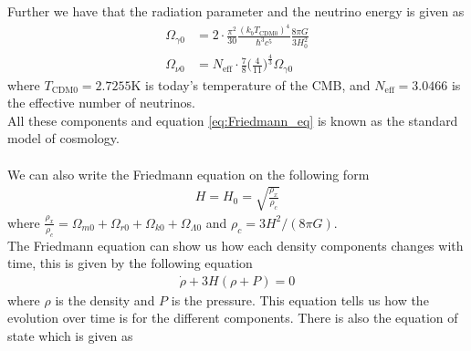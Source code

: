 \documentclass{article}
\begin{document}
\begin{multicols}{2}
Further we have that the radiation parameter and the neutrino energy is given as 
\begin{align}
    \Omega_{\gamma0}&= 2\cdot \frac{\pi^2}{30}\frac{(k_bT_{\text{CDM}0})^4}{\hbar^3c^5}\frac{8\pi G}{3H_0^2}\\
    \Omega_{\nu0}&=N_\text{eff}\cdot\frac{7}{8}\bigg(\frac{4}{11}\bigg)^\frac{4}{3}\Omega_{\gamma0}
\end{align}
where $T_{\text{CDM}0}=2.7255$K is today's temperature of the CMB, and $N_\text{eff}=3.0466$ is the effective number of neutrinos. \\
All these components and equation \eqref{eq:Friedmann_eq} is known as the standard model of cosmology.\\   
\\
We can also write the Friedmann equation on the following form
\begin{align}
    H=H_0=\sqrt{\frac{\rho_x}{\rho_c}} \label{eq:H_rho}
\end{align}
where $\frac{\rho_x}{\rho_c}=\Omega_{m0}+\Omega_{r0}+\Omega_{k0}+\Omega_{\Lambda 0}$ and $\rho_c=3H^2/(8\pi G)$.\\
The Friedmann equation can show us how each density components changes with time, this is given by the following equation
\begin{align}
    \Dot{\rho}+3H(\rho+P)=0
\end{align}
where $\rho$ is the density and $P$ is the pressure. This equation tells us how the evolution over time is for the different components. There is also the equation of state which is given as


\end{multicols}
\end{document}
